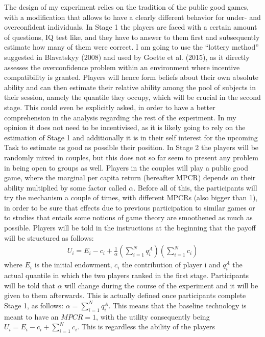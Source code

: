 \documentclass[11pt,twoside,a4paper,leqno]{article}
\begin{document}
The design of my experiment relies on the tradition of the public good games, with a modification that allows to have a clearly different behavior for under- and overconfident individuals. In Stage 1 the players are faced with a certain amount of questions, IQ test like, and they have to answer to them first and subsequently estimate how many of them were correct. I am going to use the “lottery method” suggested in Blavatskyy (2008)\textsuperscript{\cite{Blav}} and used by Goette et al. (2015)\textsuperscript{\cite{Goette}}, as it directly assesses the overconfidence problem within an environment where incentive compatibility is granted. Players will hence form beliefs about their own absolute ability and can then estimate their relative ability among the pool of subjects in their session, namely the quantile they occupy, which will be crucial in the second stage. This could even be explicitly asked, in order to have a better comprehension in the analysis regarding the rest of the experiment. In my opinion it does not need to be incentivised, as it is likely going to rely on the estimation of Stage 1 and additionally it is in their self interest for the upcoming Task to estimate as good as possible their position. \newline
In Stage 2 the players will be randomly mixed in couples, but this does not so far seem to present any problem in being open to groups as well. Players in the couples will play a public good game, where the marginal per capita return (hereafter MPCR) depends on their ability multiplied by some factor called $\alpha$. Before all of this, the participants will try the mechanism a couple of times, with different MPCRs (also bigger than 1), in order to be sure that effects due to previous participation to similar games or to studies that entails some notions of game theory are smoothened as much as possible. 
Players will be told in the instructions at the beginning that the payoff will be structured as follows:
\begin{align}
	U_{i} = E_{i} - c_{i} + \frac{1}{\alpha}(\sum_{i=1}^N q_{i}^A)(\sum_{i=1}^N c_{i})
\end{align}
where $E_{i}$ is the initial endowment, $c_{i}$ the contribution of player i and $q_{i}^A$ the actual quantile in which the two players ranked in the first stage. Participants will be told that $\alpha$ will change during the course of the experiment and it will be given to them afterwards. This is actually defined once participants complete Stage 1, as follows: $\alpha=\sum_{i=1}^N q_{i}^A$. This means that the baseline technology is meant to have an $MPCR = 1$, with the utility consequently being $U_{i} = E_{i} - c_{i} + \sum_{i=1}^N c_{i}$. This is regardless the ability of the players 
\end{document}
